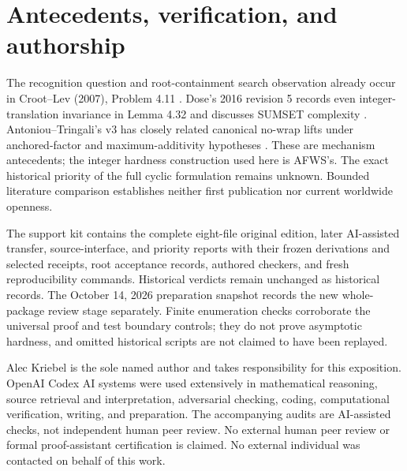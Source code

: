 \documentclass[11pt]{article}
\begin{document}
\section{Antecedents, verification, and authorship}
The recognition question and root-containment search observation already occur in Croot--Lev (2007), Problem 4.11 \cite{croot}. Dose's 2016 revision 5 records even integer-translation invariance in Lemma 4.32 and discusses SUMSET complexity \cite{dose}. Antoniou--Tringali's v3 has closely related canonical no-wrap lifts under anchored-factor and maximum-additivity hypotheses \cite{power}. These are mechanism antecedents; the integer hardness construction used here is AFWS's. The exact historical priority of the full cyclic formulation remains unknown. Bounded literature comparison establishes neither first publication nor current worldwide openness.

The support kit contains the complete eight-file original edition, later AI-assisted transfer, source-interface, and priority reports with their frozen derivations and selected receipts, root acceptance records, authored checkers, and fresh reproducibility commands. Historical verdicts remain unchanged as historical records. The October 14, 2026 preparation snapshot records the new whole-package review stage separately. Finite enumeration checks corroborate the universal proof and test boundary controls; they do not prove asymptotic hardness, and omitted historical scripts are not claimed to have been replayed.

Alec Kriebel is the sole named author and takes responsibility for this exposition. OpenAI Codex AI systems were used extensively in mathematical reasoning, source retrieval and interpretation, adversarial checking, coding, computational verification, writing, and preparation. The accompanying audits are AI-assisted checks, not independent human peer review. No external human peer review or formal proof-assistant certification is claimed. No external individual was contacted on behalf of this work.
\end{document}

